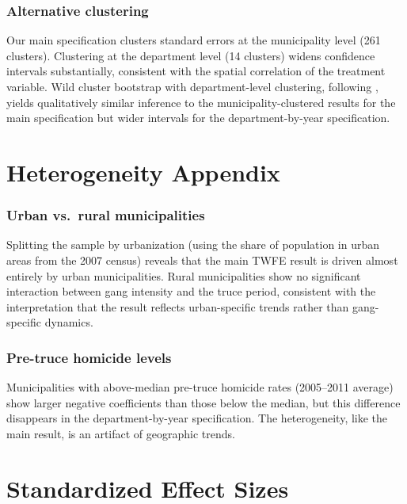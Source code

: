 \documentclass[12pt]{article}
\begin{document}
\subsubsection*{Alternative clustering} Our main specification clusters standard errors at the municipality level (261 clusters). Clustering at the department level (14 clusters) widens confidence intervals substantially, consistent with the spatial correlation of the treatment variable. Wild cluster bootstrap with department-level clustering, following \citet{cameron_etal2008}, yields qualitatively similar inference to the municipality-clustered results for the main specification but wider intervals for the department-by-year specification.


\section{Heterogeneity Appendix}
\label{sec:het_appendix}

\subsubsection*{Urban vs.\ rural municipalities} Splitting the sample by urbanization (using the share of population in urban areas from the 2007 census) reveals that the main TWFE result is driven almost entirely by urban municipalities. Rural municipalities show no significant interaction between gang intensity and the truce period, consistent with the interpretation that the result reflects urban-specific trends rather than gang-specific dynamics.

\subsubsection*{Pre-truce homicide levels} Municipalities with above-median pre-truce homicide rates (2005--2011 average) show larger negative coefficients than those below the median, but this difference disappears in the department-by-year specification. The heterogeneity, like the main result, is an artifact of geographic trends.


\section{Standardized Effect Sizes}
\label{sec:sde}


\end{document}

